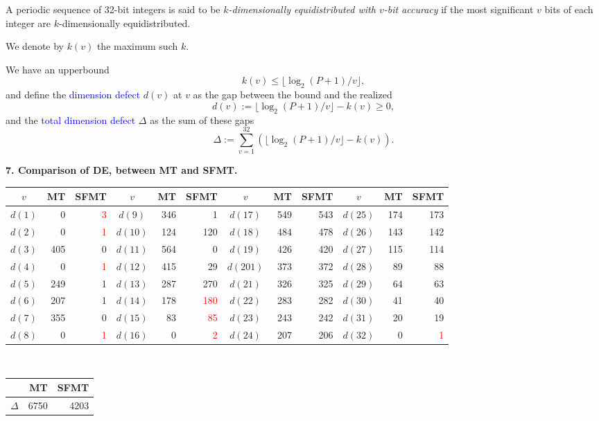 \documentclass[a4j,12pt,landscape]{jarticle}
\begin{document}
\newpage
A periodic sequence of 32-bit integers is said to be
{\em $k$-dimensionally equidistributed with $v$-bit accuracy}
if the most significant $v$ bits of each integer are
$k$-dimensionally equidistributed. 

We denote by $k(v)$ the maximum such $k$. 

\vskip 5mm
We have an upperbound 
$$
k(v) \leq \lfloor \log_2 (P+1) / v \rfloor, 
$$
and define the \textcolor{blue}{dimension defect} $d(v)$ at $v$
as the gap between the bound and the realized
$$
d(v):= \lfloor \log_2 (P+1) / v \rfloor - k(v) \geq 0, 
$$
and the \textcolor{blue}{total dimension defect} $\Delta$
as the sum of these gaps 
$$
\Delta := \sum_{v=1}^{32}(\lfloor \log_2 (P+1) / v \rfloor -k(v)).
$$

\newpage
{\bf 7. Comparison of DE, between MT and SFMT.}
\begin{center}
\LARGE
\begin{tabular}{|c|rr||c|rr||c|rr||c|rr|} \hline
$v$ & MT & SFMT & $v$ & MT & SFMT & $v$ & MT & SFMT & $v$ & MT & SFMT\\ \hline
$d(1)$& 0 & \textcolor{red}{3}
 &$d(9)$& 346 & 1 & $d(17)$ & 549 & 543 & $d(25)$ & 174 & 173\\
$d(2)$& 0 & \textcolor{red}{1} 
&$d(10)$& 124 & 120 & $d(18)$ & 484 & 478 & $d(26)$ & 143 & 142\\
$d(3)$& 405 & 0 &$d(11)$& 564 & 0 & $d(19)$ & 426 & 420 & $d(27)$ & 115 & 114\\
$d(4)$& 0 & \textcolor{red}{1}
 &$d(12)$& 415 & 29 & $d(201)$ & 373 & 372 & $d(28)$ & 89 & 88\\
$d(5)$& 249 & 1 &$d(13)$& 287 & 270 & $d(21)$ & 326 & 325 & $d(29)$ & 64 & 63\\
$d(6)$& 207 & 1 &$d(14)$& 178 & \textcolor{red}{180}
 & $d(22)$ & 283 & 282 & $d(30)$ & 41 & 40\\
$d(7)$& 355 & 0 &$d(15)$& 83 & \textcolor{red}{85}
 & $d(23)$ & 243 & 242 & $d(31)$ & 20 & 19\\
$d(8)$& 0 & \textcolor{red}{1} &$d(16)$& 0 & \textcolor{red}{2}
 & $d(24)$ & 207 & 206 & $d(32)$ & 0 & \textcolor{red}{1} \\ \hline
\end{tabular}\\
\vskip 10mm
\begin{tabular}{crr}\hline
 & MT & SFMT \\ \hline
  $\Delta$ & 6750 & 4203 \\\hline
\end{tabular}
\end{center}
\end{document}
